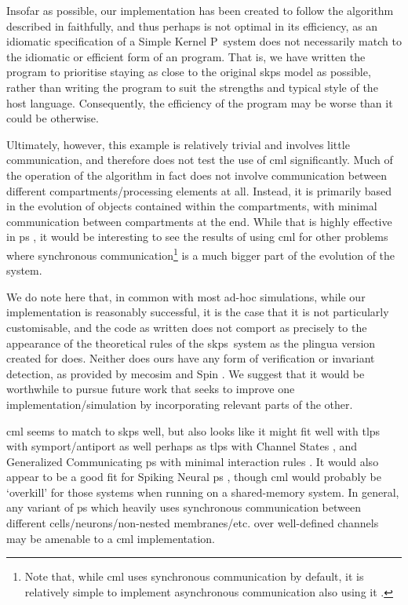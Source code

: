 Insofar as possible, our implementation has been created to follow the algorithm described in \cite{Gheorghe2013} faithfully, and thus perhaps is not optimal in its efficiency, as an idiomatic specification of a Simple Kernel P~system does not necessarily match to the idiomatic or efficient form of an \fsharp{} program.  That is, we have written the program to prioritise staying as close to the original \gls{skps} model as possible, rather than writing the program to suit the strengths and typical style of the host language.  Consequently, the efficiency of the program may be worse than it could be otherwise.  

Ultimately, however, this example is relatively trivial and involves little communication, and therefore does not test the use of \gls{cml} significantly.  Much of the operation of the algorithm in fact does not involve communication between different compartments/processing elements at all.  Instead, it is primarily based in the evolution of objects contained within the compartments, with minimal communication between compartments at the end.  While that is highly effective in \gls{ps} \cite{Paun2008}, it would be interesting to see the results of using \gls{cml} for other problems where synchronous communication\footnote{Note that, while \gls{cml} uses synchronous communication by default, it is relatively simple to implement asynchronous communication also using it \cite{Reppy2007}.} is a much bigger part of the evolution of the system.

We do note here that, in common with most ad-hoc simulations, while our implementation is reasonably successful, it is the case that it is not particularly customisable, and the code as written does not comport as precisely to the appearance of the theoretical rules of the \gls{skps}~system as the \gls{plingua} version created for \cite{Gheorghe2013} does.  Neither does ours have any form of verification or invariant detection, as provided by \gls{mecosim} \cite{Perez-Hurtado2010} and Spin \cite{Ben-Ari2008,Lefticaru2011}.  We suggest that it would be worthwhile to pursue future work that seeks to improve one implementation/simulation by incorporating relevant parts of the other.

\gls{cml} seems to match to \gls{skps} well, but also looks like it might fit well with \gls{tlps} with symport/antiport \cite{Verlan2005} as well perhaps as \gls{tlps} with Channel States \cite{Song2016}, and Generalized Communicating \gls{ps} with minimal interaction rules \cite{Csuhaj-Varju2011}.  It would also appear to be a good fit for Spiking Neural \gls{ps} \cite{Ionescu2006}, though \gls{cml} would probably be `overkill' for those systems when running on a shared-memory system.  In general, any variant of \gls{ps} which heavily uses synchronous communication between different cells/neurons/non-nested membranes/etc. over well-defined channels may be amenable to a \gls{cml} implementation.

